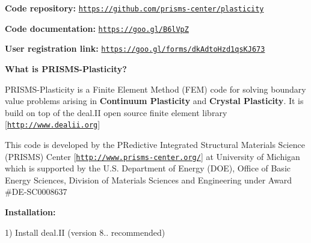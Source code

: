 {\bfseries Code repository\-:} \href{https://github.com/prisms-center/plasticity}{\tt https\-://github.\-com/prisms-\/center/plasticity} \par
 {\bfseries Code documentation\-:} \href{https://goo.gl/B6lVpZ}{\tt https\-://goo.\-gl/\-B6l\-Vp\-Z} \par
 {\bfseries User registration link\-:} \href{https://goo.gl/forms/dkAdtoHzd1qsKJ673}{\tt https\-://goo.\-gl/forms/dk\-Adto\-Hzd1qs\-K\-J673} \par


{\bfseries What is P\-R\-I\-S\-M\-S-\/\-Plasticity?}

P\-R\-I\-S\-M\-S-\/\-Plasticity is a Finite Element Method (F\-E\-M) code for solving boundary value problems arising in {\bfseries Continuum Plasticity} and {\bfseries Crystal Plasticity}. It is build on top of the deal.\-I\-I open source finite element library \mbox{[}\href{http://www.dealii.org}{\tt http\-://www.\-dealii.\-org}\mbox{]}

This code is developed by the P\-Redictive Integrated Structural Materials Science (P\-R\-I\-S\-M\-S) Center \mbox{[}\href{http://www.prisms-center.org/}{\tt http\-://www.\-prisms-\/center.\-org/}\mbox{]} at University of Michigan which is supported by the U.\-S. Department of Energy (D\-O\-E), Office of Basic Energy Sciences, Division of Materials Sciences and Engineering under Award \#\-D\-E-\/\-S\-C0008637

{\bfseries Installation\-:}

1) Install deal.\-I\-I (version 8.. recommended)\par

